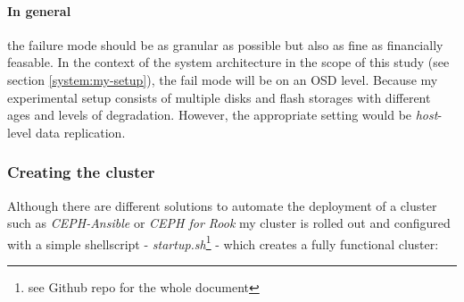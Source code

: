 \documentclass[titlepage, a4paper, 11pt]{scrartcl}
\begin{document}
                \paragraph{In general} the failure mode should be as granular as possible but also as fine as financially feasable.
                In the context of the system architecture in the scope of this study (see section \ref{system:my-setup}), the fail mode will be on an OSD level.
                Because my experimental setup consists of multiple disks and flash storages with different ages and levels of degradation.
                However, the appropriate setting would be \textit{host}-level data replication.

            \subsubsection{Creating the cluster}

                Although there are different solutions to automate the deployment of a cluster such as \textit{CEPH-Ansible}\cite{cephansible} or \textit{CEPH for Rook}\cite{RookDocs} my cluster is rolled out and configured with a simple shellscript - \textit{startup.sh}\footnote{see Github repo for the whole document} - which creates a fully functional cluster:
\end{document}
